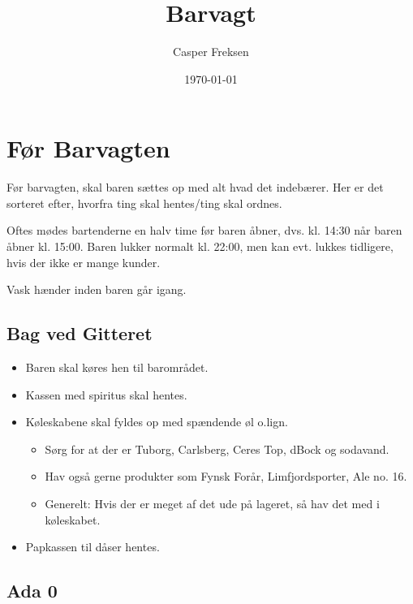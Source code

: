 

\title{Barvagt}
\date{\today}
\author{Casper Freksen}



\maketitle

\tableofcontents

\section{Før Barvagten}
\label{sec:pre-barvagten}

Før barvagten, skal baren sættes op med alt hvad det indebærer. Her er
det sorteret efter, hvorfra ting skal hentes/ting skal ordnes.

Oftes mødes bartenderne en halv time før baren åbner, dvs. kl. 14:30
når baren åbner kl. 15:00. Baren lukker normalt kl. 22:00, men kan
evt. lukkes tidligere, hvis der ikke er mange kunder.

Vask hænder inden baren går igang.

\subsection{Bag ved Gitteret}
\label{sec:pre:bag-ved-gitteret}

\begin{itemize}
\item Baren skal køres hen til barområdet.
\item Kassen med spiritus skal hentes.
\item Køleskabene skal fyldes op med spændende øl
  o.lign.
  \begin{itemize}
  \item Sørg for at der er Tuborg, Carlsberg, Ceres Top,
    dBock\texttrademark{} og sodavand.
  \item Hav også gerne produkter som Fynsk Forår, Limfjordsporter, Ale
    no. 16.
  \item Generelt: Hvis der er meget af det ude på lageret, så hav det
    med i køleskabet.
  \end{itemize}
\item Papkassen til dåser hentes.
\end{itemize}

\subsection{Ada 0}
\label{sec:pre:ada}

